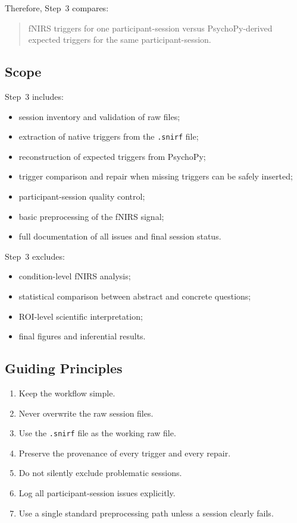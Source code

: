 \documentclass[11pt]{article}
\begin{document}
Therefore, Step~3 compares:
\begin{quote}
fNIRS triggers for one participant-session \quad versus \quad PsychoPy-derived expected triggers
for the same participant-session.
\end{quote}

\subsection{Scope}
Step~3 includes:
\begin{itemize}
    \item session inventory and validation of raw files;
    \item extraction of native triggers from the \texttt{.snirf} file;
    \item reconstruction of expected triggers from PsychoPy;
    \item trigger comparison and repair when missing triggers can be safely inserted;
    \item participant-session quality control;
    \item basic preprocessing of the fNIRS signal;
    \item full documentation of all issues and final session status.
\end{itemize}

Step~3 excludes:
\begin{itemize}
    \item condition-level fNIRS analysis;
    \item statistical comparison between abstract and concrete questions;
    \item ROI-level scientific interpretation;
    \item final figures and inferential results.
\end{itemize}

\subsection{Guiding Principles}
\begin{enumerate}
    \item Keep the workflow simple.
    \item Never overwrite the raw session files.
    \item Use the \texttt{.snirf} file as the working raw file.
    \item Preserve the provenance of every trigger and every repair.
    \item Do not silently exclude problematic sessions.
    \item Log all participant-session issues explicitly.
    \item Use a single standard preprocessing path unless a session clearly fails.
\end{enumerate}
\end{document}
